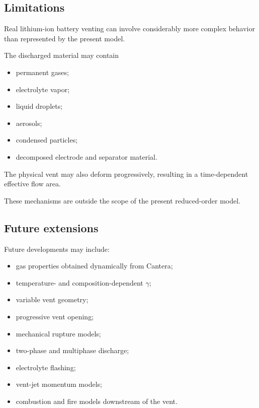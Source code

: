 \subsection{Limitations}

Real lithium-ion battery venting can involve considerably more complex
behavior than represented by the present model.

The discharged material may contain

\begin{itemize}
    \item permanent gases;
    \item electrolyte vapor;
    \item liquid droplets;
    \item aerosols;
    \item condensed particles;
    \item decomposed electrode and separator material.
\end{itemize}

The physical vent may also deform progressively, resulting in a
time-dependent effective flow area.

These mechanisms are outside the scope of the present reduced-order
model.


\subsection{Future extensions}

Future developments may include:

\begin{itemize}
    \item gas properties obtained dynamically from Cantera;
    \item temperature- and composition-dependent $\gamma$;
    \item variable vent geometry;
    \item progressive vent opening;
    \item mechanical rupture models;
    \item two-phase and multiphase discharge;
    \item electrolyte flashing;
    \item vent-jet momentum models;
    \item combustion and fire models downstream of the vent.
\end{itemize}